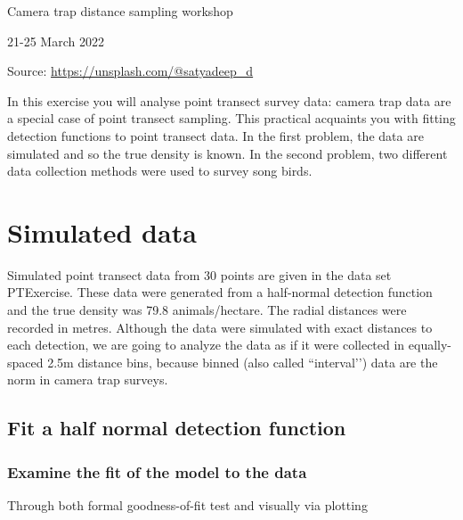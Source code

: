 \documentclass[a4paper]{article}
\begin{document}
\phantom{a}

\bigskip

{\Large Camera trap distance sampling workshop}

{\large 21-25 March 2022}

\begin{flushright}
\tiny{Source: \url{https://unsplash.com/@satyadeep_d}}
\end{flushright}

%
{%
}

In this exercise you will analyse point transect survey data: camera trap data are a special case of point transect sampling. This practical acquaints you with fitting detection functions to point transect data. In the first problem, the data are simulated and so the true density is known. In the second problem, two different data collection methods were used to survey song birds.

\section{Simulated data}
Simulated point transect data from 30 points are given in the data set PTExercise. These data were generated from a half-normal detection function and the true density was 79.8 animals/hectare.  The radial distances were recorded in metres. Although the data were simulated with exact distances to each detection, we are going to analyze the data as if it were collected in equally-spaced 2.5m distance bins, because binned (also called ``interval’’) data are the norm in camera trap surveys.

\subsection{Fit a half normal detection function}

\subsubsection{Examine the fit of the model to the data}
Through both formal goodness-of-fit test and visually via plotting
\end{document}
